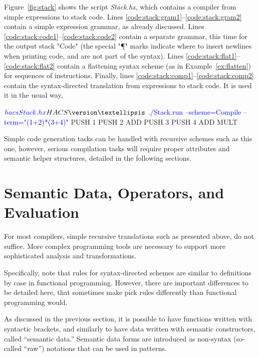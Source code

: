 \documentclass[11pt]{article} %
\begin{document}
\begin{example}\label{ex:stack}
  Figure~\ref{fig:stack} shows the \HAX script \emph{Stack.hx}, which contains a compiler from
  simple expressions to stack code. Lines \ref{code:stack:gram1}--\ref{code:stack:gram2} contain a
  simple expression grammar, as already discussed. Lines
  \ref{code:stack:code1}--\ref{code:stack:code2} contain a separate grammar, this time for the
  output stack "Code" (the special "¶" marks indicate where to insert newlines when printing code,
  and are not part of the syntax). Lines \ref{code:stack:flat1}--\ref{code:stack:flat2} contain a
  flattening syntax scheme (as in Example~\ref{ex:flatten}) for sequences of instructions.  Finally,
  lines \ref{code:stack:comp1}--\ref{code:stack:comp2} contain the syntax-directed translation from
  expressions to stack code. It is used it in the usual way,
  \begin{code}[commandchars=\\\{\}]
$ \textcolor{blue}{hacs Stack.hx}
HACS \version
…
$ \textcolor{blue}{./Stack.run --scheme=Compile --term="(1+2)*(3+4)"}
  PUSH 1 
  PUSH 2 
  ADD 
  PUSH 3 
  PUSH 4 
  ADD 
  MULT 
  \end{code}
  Simple code generation tasks can be handled with recursive schemes such as this one, however,
  serious compilation tasks will require proper attributes and semantic helper structures, detailed
  in the following sections.
\end{example}


\section{Semantic Data, Operators, and Evaluation}
\label{sec:eval}

For most compilers, simple recursive translations such as presented above, do not suffice. More
complex programming tools are necessary to support more sophisticated analysis and transformations.

Specifically, note that rules for syntax-directed schemes are similar to definitions by case in
functional programming. However, there are important differences to be detailed here, that sometimes
make \HAX pick rules differently than functional programming would.

As discussed in the previous section, it is possible to have functions written with syntactic
brackets, and similarly to have data written with semantic constructors, called ``semantic data.''
Semantic data forms are introduced as non-syntax (so-called ``raw'') notations that can be used in
patterns.
\end{document}
